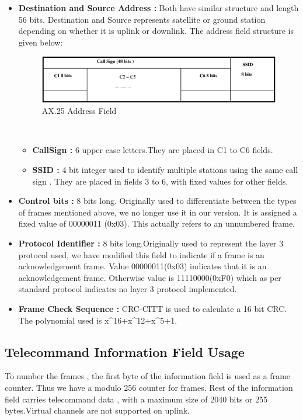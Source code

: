\documentclass[BTech]{iitmdiss}
\begin{document}
\begin{itemize}
\item \textbf{Destination and Source Address : } Both have similar structure and length  56 bits. Destination and Source represents satellite or ground station depending on whether it is uplink or downlink. The address field structure is given below:
\newline
\begin{figure}[H]

\includegraphics[scale = 0.65]{addressfield.eps}
\caption{AX.25 Address Field}
\label{fig:ax25addressfield}
\end{figure}

\\
\begin{itemize}

\item \textbf{CallSign : } 6 upper case letters.They are placed in C1 to C6 fields.
\item \textbf{SSID : } 4 bit integer used to identify multiple stations using the same call sign . They are placed in fields 3 to 6, with fixed values for other fields.
\end{itemize}
\item \textbf{Control bits : }8 bits long. Originally used to differentiate between the types of frames mentioned above, we no longer use it in our version. It is assigned a fixed value of 00000011 (0x03). This actually refers to an unnumbered frame. 
\item \textbf{Protocol Identifier : }8 bits long.Originally used to represent the layer 3 protocol used, we have modified this field to indicate if a frame is an acknowledgement frame. Value 00000011(0x03) indicates that it is an acknowledgement frame. Otherwise value is 11110000(0xF0) which as per standard protocol indicates no layer 3 protocol implemented.
\item \textbf{Frame Check Sequence : }CRC-CITT is used to calculate a 16 bit CRC. The polynomial used is x^{16}+x^{12}+x^{5}+1.


\end{itemize}

\subsection{Telecommand Information Field Usage }
To number the frames , the first byte of the information field is used as a  frame counter. Thus we have a modulo 256 counter for frames. Rest of the information field carries telecommand data , with a maximum size of 2040 bits or 255 bytes.Virtual channels are not supported on uplink.
\end{document}
